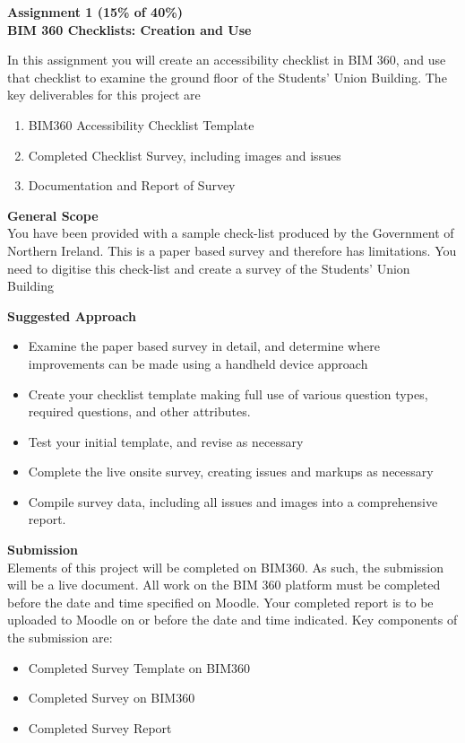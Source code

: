 
	
\begin{flushleft}
\Large\textbf{Assignment 1 (15\% of 40\%)\\
	BIM 360 Checklists: Creation and Use}\\
\end{flushleft}

In this assignment you will create an accessibility checklist in BIM 360, and use that checklist to examine the ground floor of the Students' Union Building.  The key deliverables for this project are

\begin{enumerate}
	\item BIM360 Accessibility Checklist Template
	\item Completed Checklist Survey, including images and issues
	\item Documentation and Report of Survey 
\end{enumerate}

\textbf{General Scope}\\


You have been provided with a sample check-list produced by the Government of Northern Ireland.  This is a paper based survey and therefore has limitations.  You need to digitise this check-list and create a survey of the Students' Union Building

\vspace{.5cm}

\textbf{Suggested Approach}

\begin{itemize}
	\item Examine the paper based survey in detail, and determine where improvements can be made using a handheld device approach
	\item Create your checklist template making full use of various question types, required questions, and other attributes.
	\item Test your initial template, and revise as necessary
	\item Complete the live onsite survey, creating issues and markups as necessary
	\item Compile survey data, including all issues and images into a comprehensive report.
\end{itemize}


\newpage


\textbf{Submission}\\
Elements of this project will be completed on BIM360. As such, the submission will be a live document.  All work on the BIM 360 platform must be completed before the date and time specified on Moodle.  Your completed report is to be uploaded to Moodle on or before the date and time indicated.  Key components of the submission are:
\begin{itemize}
	\item Completed Survey Template on BIM360
	\item Completed Survey on BIM360	
	\item Completed Survey Report
\end{itemize}




